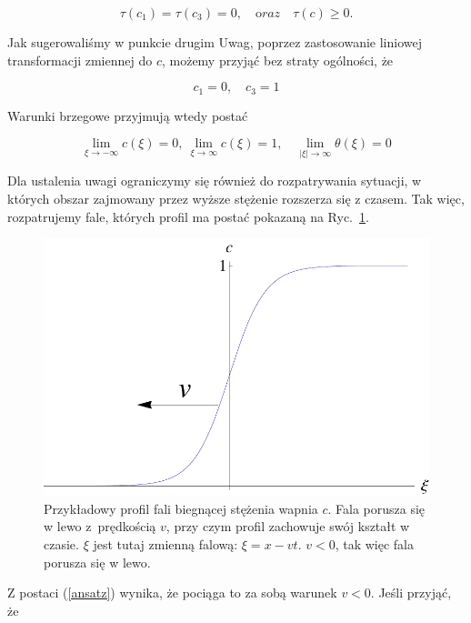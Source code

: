 \begin{equation}  \tau(c_1)=\tau(c_3)=0, \quad {\mathrm oraz} \quad \tau(c) \geq 0. \end{equation} 

\noindent Jak sugerowaliśmy w punkcie drugim Uwag, poprzez zastosowanie liniowej transformacji zmiennej do $c$, możemy przyjąć bez straty ogólności, że 

\[  c_1=0, \quad c_3 = 1 \] 



\noindent Warunki brzegowe przyjmują wtedy postać

\[ \lim_{\xi \to -\infty} c(\xi) = 0, ~\lim_{\xi \to \infty} c(\xi) = 1, 
\quad  
\lim_{|\xi| \to \infty} \theta(\xi) = 0 \] 

\medskip 

Dla ustalenia uwagi ograniczymy się również do rozpatrywania sytuacji, w których obszar zajmowany przez wyższe stężenie rozszerza się z czasem. Tak więc, rozpatrujemy fale, których profil ma postać pokazaną na Ryc.~\ref{FM}. 


\begin{figure}[ht!]  
	\hspace{2cm} \includegraphics[width=0.85\linewidth]{rysunki/rozdzial_3/FALA_MICHAL.pdf} 
	\caption[Przykładowy profil fali biegnącej stężenia wapnia]{{\small Przykładowy profil fali biegnącej stężenia wapnia $c$. Fala porusza się w lewo z~prędkością $v$, przy czym profil zachowuje swój kształt w czasie. $\xi$ jest tutaj zmienną falową: $\xi = x - vt$. $v<0$, tak więc fala porusza się w lewo. }} \label{FM} 
\end{figure}

\noindent Z postaci (\ref{ansatz}) wynika, że pociąga to za sobą warunek $v<0$. Jeśli przyjąć, że 

